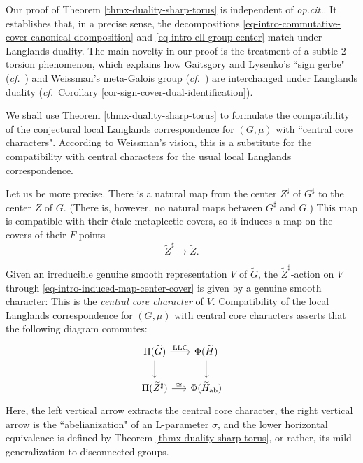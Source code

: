 \documentclass[10pt,english,reqno]{amsart}
\newcommand{\abelian}{\textnormal{ab}}
\newcommand{\LLC}{\textnormal{LLC}}
\theoremstyle{definition}
\numberwithin{equation}{section}
\begin{document}
Our proof of Theorem \ref{thmx-duality-sharp-torus} is independent of \emph{op.cit.}. It establishes that, in a precise sense, the decompositions \eqref{eq-intro-commutative-cover-canonical-deomposition} and \eqref{eq-intro-ell-group-center} match under Langlands duality. The main novelty in our proof is the treatment of a subtle $2$-torsion phenomenon, which explains how Gaitsgory and Lysenko's ``sign gerbe" (\emph{cf.}~\cite[\S4.8]{MR3769731}) and Weissman's meta-Galois group (\emph{cf.}~\cite[\S4]{MR3802418}) are interchanged under Langlands duality (\emph{cf.}~Corollary \ref{cor-sign-cover-dual-identification}).

We shall use Theorem \ref{thmx-duality-sharp-torus} to formulate the compatibility of the conjectural local Langlands correspondence for $(G, \mu)$ with ``central core characters". According to Weissman's vision, this is a substitute for the compatibility with central characters for the usual local Langlands correspondence.

Let us be more precise. There is a natural map from the center $Z^{\sharp}$ of $G^{\sharp}$ to the center $Z$ of $G$. (There is, however, no natural maps between $G^{\sharp}$ and $G$.) This map is compatible with their \'etale metaplectic covers, so it induces a map on the covers of their $F$-points
\begin{equation}
\label{eq-intro-induced-map-center-cover}
\widetilde Z^{\sharp} \rightarrow \widetilde Z.
\end{equation}

Given an irreducible genuine smooth representation $V$ of $\widetilde G$, the $\widetilde Z^{\sharp}$-action on $V$ through \eqref{eq-intro-induced-map-center-cover} is given by a genuine smooth character: This is the \emph{central core character} of $V$. Compatibility of the local Langlands correspondence for $(G, \mu)$ with central core characters asserts that the following diagram commutes:
\begin{equation}
\label{eq-intro-compatibility-central-character}
\begin{tikzcd}[column sep = 1.5em]
	\Pi(\widetilde G) \ar[d] \ar[r, "\LLC"] & \Phi(\widetilde H) \ar[d] \\
	\Pi(\widetilde Z^{\sharp}) \ar[r, "\simeq"] & \Phi(\widetilde H_{\abelian})
\end{tikzcd}
\end{equation}
Here, the left vertical arrow extracts the central core character, the right vertical arrow is the ``abelianization" of an L-parameter $\sigma$, and the lower horizontal equivalence is defined by Theorem \ref{thmx-duality-sharp-torus}, or rather, its mild generalization to disconnected groups.
\end{document}
